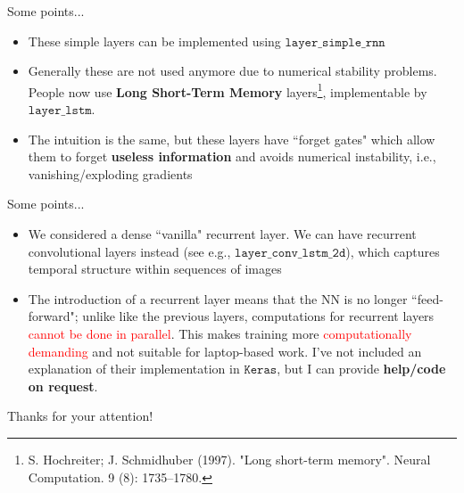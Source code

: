 \documentclass{beamer}
\begin{document}
\begin{frame}{Some points...}
\begin{itemize}
\item These simple layers can be implemented using $\texttt{layer\_simple\_rnn}$
\item Generally these are not used anymore due to numerical stability problems. People now use \textbf{Long Short-Term Memory} layers\footnote{S. Hochreiter; J. Schmidhuber (1997). "Long short-term memory". Neural Computation. 9 (8): 1735–1780.}, implementable by $\texttt{layer\_lstm}$.
\item The intuition is the same, but these layers have ``forget gates" which allow them to forget \textbf{useless information} and avoids numerical instability, i.e., vanishing/exploding gradients
\end{itemize}

\end{frame}
\begin{frame}{Some points...}
\begin{itemize}
\item We considered a dense ``vanilla" recurrent layer. We can have recurrent convolutional layers instead (see e.g., $\texttt{layer\_conv\_lstm\_2d}$), which captures temporal structure within sequences of images
\item The introduction of a recurrent layer means that the NN is no longer ``feed-forward"; unlike like the previous layers, computations for recurrent layers \textcolor{red}{cannot be done in parallel}. This makes training more \textcolor{red}{computationally demanding} and not suitable for laptop-based work. I've not included an explanation of their implementation in $\texttt{Keras}$, but I can provide \textbf{help/code on request}.
\end{itemize}
\end{frame}



\begin{frame}
\begin{center}
\Huge Thanks for your attention!
\end{center}
\end{frame}
\end{document}
